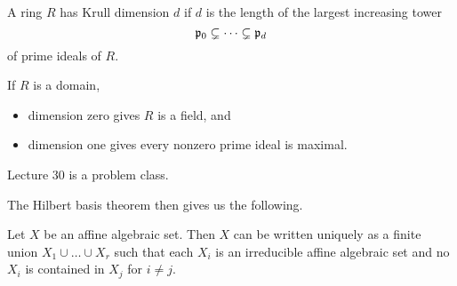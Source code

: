 \begin{definition}
A ring $ R $ has Krull dimension $ d $ if $ d $ is the length of the largest increasing tower
$$ \mathfrak{p}_0 \subsetneq \dots \subsetneq \mathfrak{p}_d $$
of prime ideals of $ R $.
\end{definition}

\begin{example*}
If $ R $ is a domain,
\begin{itemize}
\item dimension zero gives $ R $ is a field, and
\item dimension one gives every nonzero prime ideal is maximal.
\end{itemize}
\end{example*}


Lecture 30 is a problem class.

The Hilbert basis theorem then gives us the following.

\begin{proposition}
Let $ X $ be an affine algebraic set. Then $ X $ can be written uniquely as a finite union $ X_1 \cup \dots \cup X_r $ such that each $ X_i $ is an irreducible affine algebraic set and no $ X_i $ is contained in $ X_j $ for $ i \ne j $.
\end{proposition}

